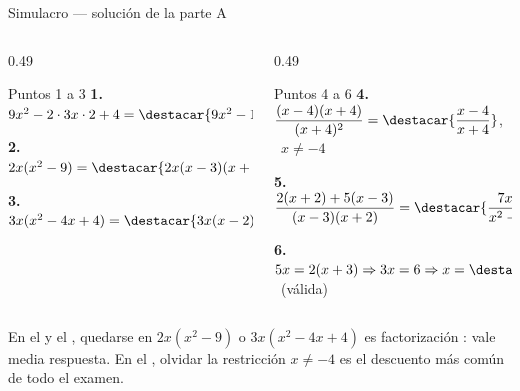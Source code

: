 \documentclass[aspectratio=169,10pt]{beamer}
\begin{document}
\begin{frame}{Simulacro — solución de la parte A}
  \scriptsize
  \begin{columns}[T,onlytextwidth]
    \begin{column}{0.49\textwidth}
      \begin{block}{Puntos 1 a 3}
        \tiny
        \textbf{1.} $9x^{2}-2\cdot 3x\cdot 2+4
        = \destacar{9x^{2}-12x+4}$

        \vspace{0.1cm}
        \textbf{2.} $2x(x^{2}-9)
        = \destacar{2x(x-3)(x+3)}$

        \vspace{0.1cm}
        \textbf{3.} $3x(x^{2}-4x+4)
        = \destacar{3x(x-2)^{2}}$
      \end{block}
    \end{column}
    \begin{column}{0.49\textwidth}
      \begin{block}{Puntos 4 a 6}
        \tiny
        \textbf{4.} $\dfrac{(x-4)(x+4)}{(x+4)^{2}}
        = \destacar{\dfrac{x-4}{x+4}}$, \ $x\neq -4$

        \vspace{0.1cm}
        \textbf{5.} $\dfrac{2(x+2)+5(x-3)}{(x-3)(x+2)}
        = \destacar{\dfrac{7x-11}{x^{2}-x-6}}$

        \vspace{0.1cm}
        \textbf{6.} $5x=2(x+3) \Rightarrow 3x=6
        \Rightarrow x=\destacar{2}$ \ (válida)
      \end{block}
    \end{column}
  \end{columns}

  \vspace{0.08cm}
  {\tiny\color{uniGris} En el  y el , quedarse en
  $2x(x^{2}-9)$ o $3x(x^{2}-4x+4)$ es factorización : vale
  media respuesta. En el , olvidar la restricción $x\neq -4$ es el
  descuento más común de todo el examen.}
\end{frame}
\end{document}
